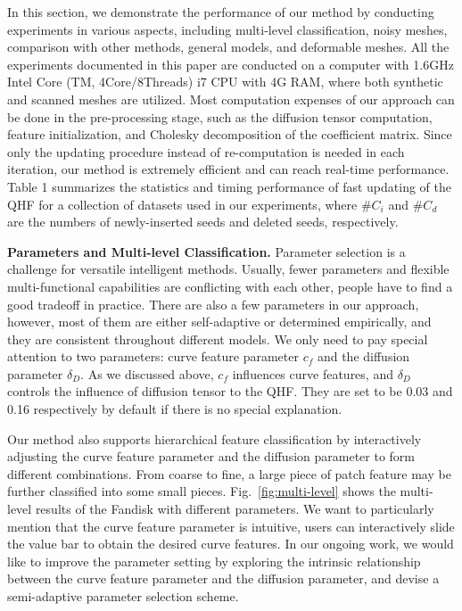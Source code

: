 \documentclass[10pt,journal,cspaper,compsoc]{IEEEtran}
\begin{document}
In this section, we demonstrate the performance of our method by
conducting experiments in various aspects, including multi-level
classification, noisy meshes, comparison with other methods, general
models, and deformable meshes. All the experiments documented in this
paper are conducted on a computer with 1.6GHz Intel Core (TM,
4Core/8Threads) i7 CPU with 4G RAM, where both synthetic and scanned
meshes are utilized. Most computation expenses of our approach can be
done in the pre-processing stage, such as the diffusion tensor
computation, feature initialization, and Cholesky decomposition of the
coefficient matrix. Since only the updating procedure instead of
re-computation is needed in each iteration, our method is extremely
efficient and can reach real-time performance. Table 1 summarizes the
statistics and timing performance of fast updating of the QHF for a
collection of datasets used in our experiments, where $\#C_{i}$ and
$\#C_{d}$ are the numbers of newly-inserted seeds and deleted seeds,
respectively.

\textbf{Parameters and Multi-level Classification.}
Parameter selection is a challenge for versatile intelligent methods.
Usually, fewer parameters and flexible multi-functional capabilities
are conflicting with each other, people have to find a good tradeoff
in practice. There are also a few parameters in our approach, however,
most of them are either self-adaptive or determined empirically, and
they are consistent throughout different models. We only need to pay
special attention to two parameters: curve feature parameter $c_f$ and
the diffusion parameter $\delta_D$. As we discussed above, $c_f$
influences curve features, and $\delta_D$ controls the influence of
diffusion tensor to the QHF. They are set to be 0.03 and 0.16
respectively by default if there is no special explanation.

Our method also supports hierarchical feature classification by
interactively adjusting the curve feature parameter and the diffusion
parameter to form different combinations. From coarse to fine, a large
piece of patch feature may be further classified into some small
pieces. Fig.~\ref{fig:multi-level} shows the multi-level results of
the Fandisk with different parameters. We want to particularly mention
that the curve feature parameter is intuitive, users can interactively
slide the value bar to obtain the desired curve features. In our
ongoing work, we would like to improve the parameter setting by
exploring the intrinsic relationship between the curve feature
parameter and the diffusion parameter, and devise a semi-adaptive
parameter selection scheme.
\end{document}
